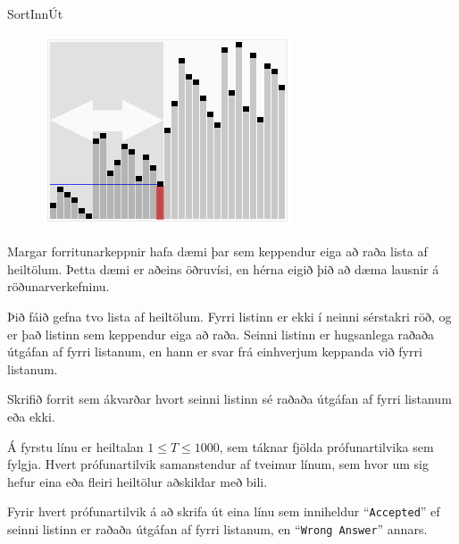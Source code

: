 \begin{problem}{Sort}{Inn}{Út}{~}{~}

	\begin{figure}
		\vspace{-25pt}
		\begin{center}
			\includegraphics[scale=0.40]{../Sort/sorting.png}
		\end{center}
		\vspace{-30pt}
	\end{figure}

	Margar forritunarkeppnir hafa dæmi þar sem keppendur eiga að raða lista af heiltölum. Þetta dæmi er aðeins öðruvísi, en hérna eigið þið að dæma lausnir á röðunarverkefninu.

	Þið fáið gefna tvo lista af heiltölum. Fyrri listinn er ekki í neinni sérstakri röð, og er það listinn sem keppendur eiga að raða. Seinni listinn er hugsanlega raðaða útgáfan af fyrri listanum, en hann er svar frá einhverjum keppanda við fyrri listanum.

	Skrifið forrit sem ákvarðar hvort seinni listinn sé raðaða útgáfan af fyrri listanum eða ekki.

	\Input

		Á fyrstu línu er heiltalan $1 \leq T \leq 1000$, sem táknar fjölda prófunartilvika sem fylgja. Hvert prófunartilvik samanstendur af tveimur línum, sem hvor um sig hefur eina eða fleiri heiltölur aðskildar með bili.

	\Output

		Fyrir hvert prófunartilvik á að skrifa út eina línu sem inniheldur "`\texttt{Accepted}"' ef seinni listinn er raðaða útgáfan af fyrri listanum, en "`\texttt{Wrong Answer}"' annars.

	\Examples

		\begin{example}
		\end{example}


\end{problem}
